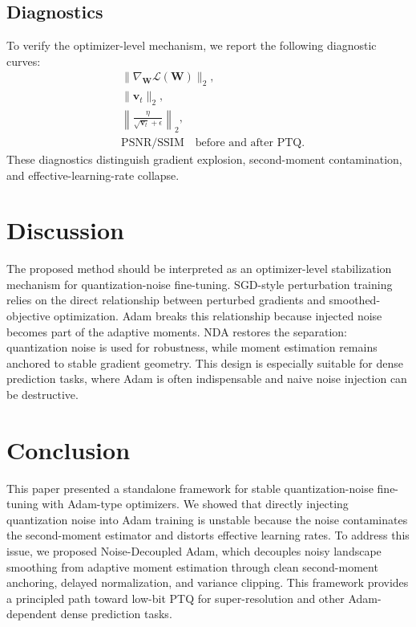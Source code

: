\documentclass[journal]{IEEEtran}
\begin{document}
\subsection{Diagnostics}
To verify the optimizer-level mechanism, we report the following diagnostic curves:
\begin{align}
    &\|\nabla_{\boldsymbol{W}}\mathcal{L}(\boldsymbol{W})\|_2,\\
    &\|\boldsymbol{v}_t\|_2,\\
    &\left\|
    \frac{\eta}{\sqrt{\boldsymbol{v}_t}+\epsilon}
    \right\|_2,\\
    &\mathrm{PSNR}/\mathrm{SSIM}
    \quad
    \text{before and after PTQ}.
\end{align}
These diagnostics distinguish gradient explosion, second-moment contamination, and effective-learning-rate collapse.

\section{Discussion}
The proposed method should be interpreted as an optimizer-level stabilization mechanism for quantization-noise fine-tuning. SGD-style perturbation training relies on the direct relationship between perturbed gradients and smoothed-objective optimization. Adam breaks this relationship because injected noise becomes part of the adaptive moments. NDA restores the separation: quantization noise is used for robustness, while moment estimation remains anchored to stable gradient geometry. This design is especially suitable for dense prediction tasks, where Adam is often indispensable and naive noise injection can be destructive.

\section{Conclusion}
This paper presented a standalone framework for stable quantization-noise fine-tuning with Adam-type optimizers. We showed that directly injecting quantization noise into Adam training is unstable because the noise contaminates the second-moment estimator and distorts effective learning rates. To address this issue, we proposed Noise-Decoupled Adam, which decouples noisy landscape smoothing from adaptive moment estimation through clean second-moment anchoring, delayed normalization, and variance clipping. This framework provides a principled path toward low-bit PTQ for super-resolution and other Adam-dependent dense prediction tasks.
\end{document}
